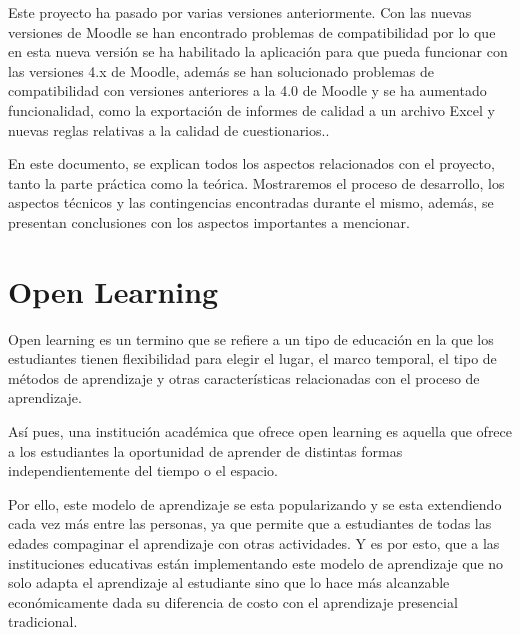 Este proyecto ha pasado por varias versiones anteriormente. Con las nuevas versiones de Moodle se han encontrado problemas de compatibilidad por lo que en esta nueva versión se ha habilitado la aplicación para que pueda funcionar con las versiones 4.x de Moodle, además se han solucionado problemas de compatibilidad con versiones anteriores a la 4.0 de Moodle y se ha aumentado funcionalidad, como la exportación de informes de calidad a un archivo Excel y nuevas reglas relativas a la calidad de cuestionarios..

En este documento, se explican todos los aspectos relacionados con el proyecto, tanto la parte práctica como la teórica. Mostraremos el proceso de desarrollo, los aspectos técnicos y las contingencias encontradas durante el mismo, además, se presentan conclusiones con los aspectos importantes a mencionar. 

\section{Open Learning}
Open learning \cite{open-learning} es un termino que se refiere a un tipo de educación en la que los estudiantes tienen flexibilidad para elegir el lugar, el marco temporal, el tipo de métodos de aprendizaje y otras características relacionadas con el proceso de aprendizaje. 

Así pues, una institución académica que ofrece open learning es aquella que ofrece a los estudiantes la oportunidad de aprender de distintas formas independientemente del tiempo o el espacio. 

Por ello, este modelo de aprendizaje se esta popularizando y se esta extendiendo cada vez más entre las personas, ya que permite que a estudiantes de todas las edades compaginar el aprendizaje con otras actividades. Y es por esto, que a las instituciones educativas están implementando este modelo de aprendizaje que no solo adapta el aprendizaje al estudiante sino que lo hace más alcanzable económicamente dada su diferencia de costo con el aprendizaje presencial tradicional.


